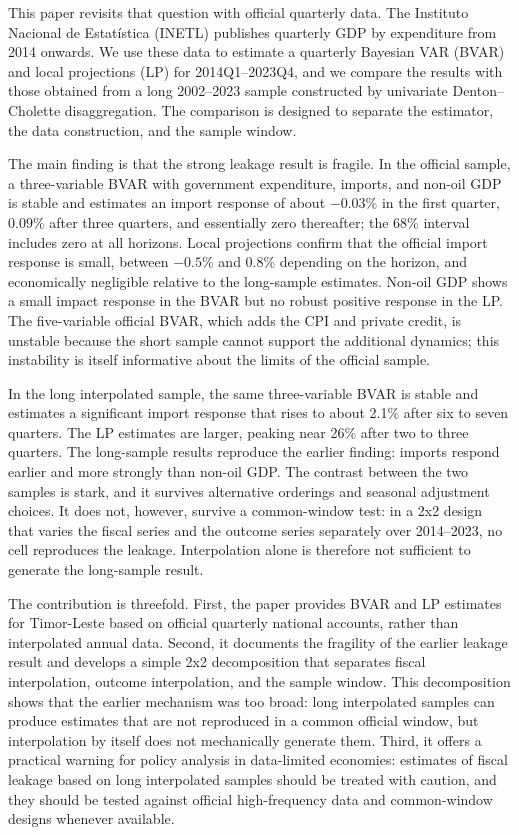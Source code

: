 \documentclass[11pt,a4paper]{article}
\begin{document}
This paper revisits that question with official quarterly data. The Instituto Nacional de Estatística (INETL) publishes quarterly GDP by expenditure from 2014 onwards. We use these data to estimate a quarterly Bayesian VAR (BVAR) and local projections (LP) for 2014Q1--2023Q4, and we compare the results with those obtained from a long 2002--2023 sample constructed by univariate Denton--Cholette disaggregation. The comparison is designed to separate the estimator, the data construction, and the sample window.

The main finding is that the strong leakage result is fragile. In the official sample, a three-variable BVAR with government expenditure, imports, and non-oil GDP is stable and estimates an import response of about $-0.03\%$ in the first quarter, $0.09\%$ after three quarters, and essentially zero thereafter; the 68\% interval includes zero at all horizons. Local projections confirm that the official import response is small, between $-0.5\%$ and $0.8\%$ depending on the horizon, and economically negligible relative to the long-sample estimates. Non-oil GDP shows a small impact response in the BVAR but no robust positive response in the LP. The five-variable official BVAR, which adds the CPI and private credit, is unstable because the short sample cannot support the additional dynamics; this instability is itself informative about the limits of the official sample.

In the long interpolated sample, the same three-variable BVAR is stable and estimates a significant import response that rises to about 2.1\% after six to seven quarters. The LP estimates are larger, peaking near 26\% after two to three quarters. The long-sample results reproduce the earlier finding: imports respond earlier and more strongly than non-oil GDP. The contrast between the two samples is stark, and it survives alternative orderings and seasonal adjustment choices. It does not, however, survive a common-window test: in a 2x2 design that varies the fiscal series and the outcome series separately over 2014--2023, no cell reproduces the leakage. Interpolation alone is therefore not sufficient to generate the long-sample result.

The contribution is threefold. First, the paper provides BVAR and LP estimates for Timor-Leste based on official quarterly national accounts, rather than interpolated annual data. Second, it documents the fragility of the earlier leakage result and develops a simple 2x2 decomposition that separates fiscal interpolation, outcome interpolation, and the sample window. This decomposition shows that the earlier mechanism was too broad: long interpolated samples can produce estimates that are not reproduced in a common official window, but interpolation by itself does not mechanically generate them. Third, it offers a practical warning for policy analysis in data-limited economies: estimates of fiscal leakage based on long interpolated samples should be treated with caution, and they should be tested against official high-frequency data and common-window designs whenever available.
\end{document}
